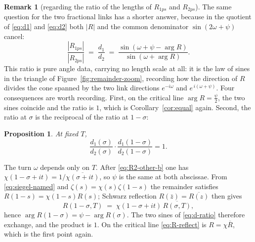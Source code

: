 \documentclass[11pt]{article}
\newtheorem{proposition}[theorem]{Proposition}
\theoremstyle{definition}
\newtheorem{remark}[theorem]{Remark}
\begin{document}
\begin{remark}[regarding the ratio of the lengths of $R_{1ps}$ and $R_{2ps}$]\label{rem:d-ratio}
The same question for the two fractional links has a shorter answer, because in
the quotient of \eqref{eq:d1} and \eqref{eq:d2} both $|R|$ and the common
denominator $\sin(2\omega+\psi)$ cancel:
\begin{equation}\label{eq:d-ratio}
\frac{|R_{1ps}|}{|R_{2ps}|}
\;=\;
\frac{d_1}{d_2}
\;=\;
\frac{\sin(\omega+\psi-\arg R)}{\sin(\omega+\arg R)}.
\end{equation}
This ratio is pure angle data, carrying no length scale at all: it is the law
of sines in the triangle of Figure~\ref{fig:remainder-zoom}, recording how the
direction of $R$ divides the cone spanned by the two link directions
$e^{-i\omega}$ and $e^{\,i(\omega+\psi)}$. Four consequences are worth
recording. First, on the critical line $\arg R=\tfrac{\psi}{2}$, the two sines
coincide and the ratio is $1$, which is Corollary~\ref{cor:equal} again.
Second, the ratio at $\sigma$ is the reciprocal of the ratio at $1-\sigma$:

\begin{proposition}\label{prop:d-ratio-reflection}
At fixed $T$,
\begin{equation}\label{eq:d-ratio-symmetry}
\frac{d_1(\sigma)}{d_2(\sigma)}
\cdot
\frac{d_1(1-\sigma)}{d_2(1-\sigma)}
=
1.
\end{equation}
\end{proposition}

The turn $\omega$ depends only on $T$. After \eqref{eq:R2-other-b} one has
$\chi(1-\sigma+it)=1/\overline{\chi(\sigma+it)}$, so $\psi$ is the same at
both abscissae. From \eqref{eq:siegel-named} and
$\zeta(s)=\chi(s)\zeta(1-s)$ the remainder satisfies
$R(1-s)=\chi(1-s)R(s)$; Schwarz reflection
$R(\bar z)=\overline{R(z)}$ then gives
\begin{equation}\label{eq:R-reflect}
R(1-\sigma,T)
\;=\;
\chi(1-\sigma+it)\,\overline{R(\sigma,T)},
\end{equation}
hence $\arg R(1-\sigma)=\psi-\arg R(\sigma)$.
The two sines of \eqref{eq:d-ratio} therefore exchange, and the product is $1$.
On the critical line \eqref{eq:R-reflect} is $R=\chi\overline{R}$, which is
the first point again.


\end{remark}
\end{document}
